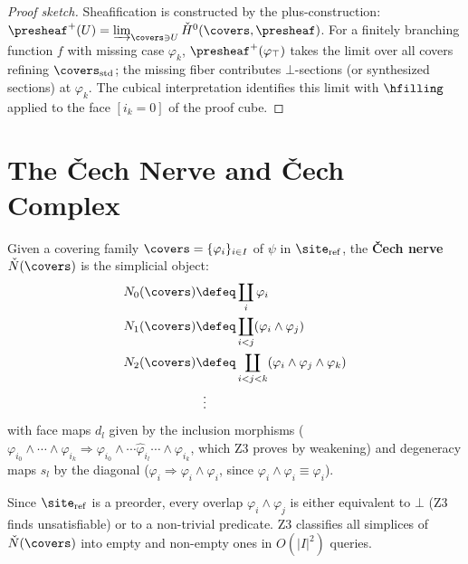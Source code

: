 \begin{proof}[Proof sketch]
Sheafification is constructed by the plus-construction:
$\presheaf^+(U) = \varinjlim_{\covers \ni U} \check{H}^0(\covers,\presheaf)$.
For a finitely branching function $f$ with missing case $\varphi_k$,
$\presheaf^+(\varphi_\top)$ takes the limit over all covers refining
$\covers_{\mathrm{std}}$; the missing fiber contributes $\bot$-sections
(or synthesized sections) at $\varphi_k$.  The cubical interpretation
identifies this limit with $\hfilling$ applied to the face $[i_k = 0]$
of the proof cube.
\end{proof}


\section{The \v{C}ech Nerve and \v{C}ech Complex}
\label{sec:cech-nerve}

\begin{definition}
\label{def:cech-nerve-ref}
Given a covering family $\covers = \{\varphi_i\}_{i \in I}$ of $\psi$
in $\site_{\mathrm{ref}}$, the \textbf{\v{C}ech nerve}
$\check{N}(\covers)$ is the simplicial object:
\begin{align*}
  N_0(\covers) &\defeq \coprod_i \varphi_i \\
  N_1(\covers) &\defeq \coprod_{i < j}
    (\varphi_i \wedge \varphi_j) \\
  N_2(\covers) &\defeq \coprod_{i < j < k}
    (\varphi_i \wedge \varphi_j \wedge \varphi_k) \\
  &\;\;\vdots
\end{align*}
with face maps $d_l$ given by the inclusion morphisms
($\varphi_{i_0} \wedge \cdots \wedge \varphi_{i_k} \Rightarrow
\varphi_{i_0} \wedge \cdots \hat{\varphi}_{i_l} \cdots \wedge \varphi_{i_k}$,
which Z3 proves by weakening) and degeneracy maps $s_l$ by the diagonal
($\varphi_i \Rightarrow \varphi_i \wedge \varphi_i$, since $\varphi_i
\wedge \varphi_i \equiv \varphi_i$).

Since $\site_{\mathrm{ref}}$ is a preorder, every overlap $\varphi_i
\wedge \varphi_j$ is either equivalent to $\bot$ (Z3 finds unsatisfiable)
or to a non-trivial predicate.  Z3 classifies all simplices of
$\check{N}(\covers)$ into empty and non-empty ones in $O(|I|^2)$ queries.
\end{definition}

